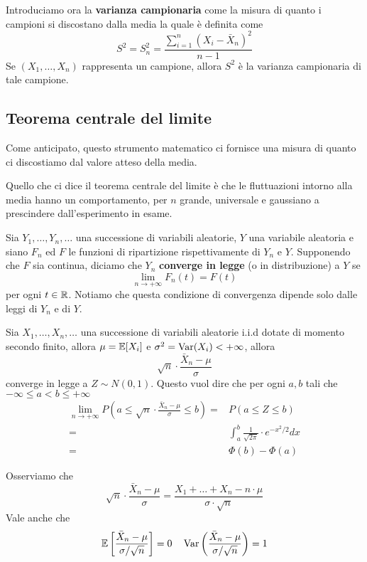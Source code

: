 Introduciamo ora la \textbf{varianza campionaria} come la misura di quanto i campioni si
discostano dalla media la quale è definita come
\[ S^2 = S_n^2 = \frac{\sum_{i=1}^n \left( X_i - \bar{X}_n \right)^2}{n - 1} \]
Se $(X_1, \dots, X_n)$ rappresenta un campione, allora $S^2$ è la varianza campionaria di tale
campione.

\subsection{Teorema centrale del limite}
Come anticipato, questo strumento matematico ci fornisce una misura di quanto ci discostiamo dal
valore atteso della media.

Quello che ci dice il teorema centrale del limite è che le fluttuazioni intorno alla media
hanno un comportamento, per $n$ grande, universale e gaussiano a prescindere dall'esperimento in
esame.

\begin{definition}
	Sia $Y_1, \dots, Y_n, \dots$ una successione di variabili aleatorie, $Y$ una variabile
	aleatoria e siano $F_n$ ed $F$ le funzioni di ripartizione rispettivamente di $Y_n$ e $Y$.
	Supponendo che $F$ sia continua, diciamo che $Y_n$ \textbf{converge in legge} (o in
	distribuzione) a $Y$ se
	\[ \lim_{n \to +\infty} F_n (t) = F(t) \]
	per ogni $t \in \mathbb{R}$. Notiamo che questa condizione di convergenza dipende solo dalle leggi di
	$Y_n$ e di $Y$.
\end{definition}

\begin{theorem}\label{th: tcl}
	Sia $X_1, \dots, X_n, \dots$ una successione di variabili aleatorie i.i.d dotate di momento
	secondo finito, allora $\mu = \mathbb{E}[X_i]$ e $\sigma^2 = \operatorname{Var}(X_i) < +\infty$, allora
	\[ \sqrt{n} \cdot \frac{\bar{X}_n - \mu}{\sigma} \]
	converge in legge a $Z \sim N(0,1)$. Questo vuol dire che per ogni $a, b$ tali che
	$-\infty \leq a < b \leq +\infty$
	\begin{align*}
		\lim_{n \to +\infty} P \left( a \leq \sqrt{n} \cdot \frac{\bar{X}_n - \mu}{\sigma}
		\leq b \right) = & P(a \leq Z \leq b)                                      \\
		=                & \int_{a}^{b} \frac{1}{\sqrt{2 \pi}} \cdot e^{-x^2/2} dx \\
		=                & \Phi(b) - \Phi(a)
	\end{align*}
\end{theorem}

\begin{observation}
	Osserviamo che
	\[
		\sqrt{n} \cdot \frac{\bar{X}_n - \mu}{\sigma} =
		\frac{X_1 + \dots + X_n - n \cdot \mu}{\sigma \cdot \sqrt{n}}
	\]
	Vale anche che
	\[
		\mathbb{E} \left[ \frac{\bar{X}_n - \mu}{\sigma / \sqrt{n}} \right] = 0 \quad
		\operatorname{Var} \left( \frac{\bar{X}_n - \mu}{\sigma / \sqrt{n}} \right) = 1
	\]
\end{observation}

